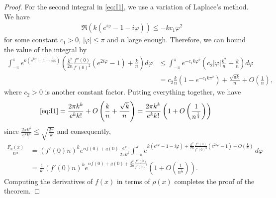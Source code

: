 \documentclass[reqno, 11pt]{amsart}
\theoremstyle{definition}
\theoremstyle{remark}
\numberwithin{equation}{section}
\begin{document}
\begin{proof}
    For the second integral in \eqref{eq:I1}, we use a variation of Laplace's method. We have
    \begin{align*}
        &\Re \left(k(e^{i\varphi} - 1 - i\varphi)\right) \le -k c_1\varphi^2
    \end{align*}
    for some constant $c_1> 0$, $|\varphi| \le \pi$ and $n$ large enough. 
    Therefore, we can bound the value of the integral by
    \begin{align*}
        \int_{-\pi}^\pi  e^{k(e^{i\varphi} - 1 - i\varphi)} \left(\frac{k^2}{2n} \frac{f''(0)}{f'(0)^2} (e^{2i\varphi} -1) + \frac{k}{n}\right)d\varphi &\leq  \int_{-\pi}^{\pi} e^{-c_1k \varphi^2} \left(c_2 |\varphi| \frac{k^2}{n} + \frac{k}{n}  
       \right) d\varphi       \\
        &= c_2\frac{k}{n}(1-e^{-c_1k\pi^2}) + \frac{\sqrt{\pi k}}{n}+ O\left(\frac{1}{n}\right),
    \end{align*}
    where $c_2>0$ is another constant factor.
    Putting everything together, we have 
    \begin{align*}
        \eqref{eq:I1} 
        &= \frac{2\pi k^k}{e^k k!} + O\left(\frac{k}{n}+\frac{\sqrt{k}}{n}\right)= \frac{2\pi k^k}{e^k k!}\left(1 + O\left(\frac{1}{n^{\frac{1}{4}}}\right)\right)
    \end{align*}
    since $\frac{2\pi k^k}{e^k k!} \leq \sqrt{\frac{2\pi}{k}}$ and consequently,
    \begin{align*}
        [x^k]\frac{F_n(x)}{n^\alpha} & = (f'(0)n)^k  e^{nf(0)+g(0)} \frac{e^k}{2\pi k^{k}}  
        \int_{-\pi}^\pi  e^{k(e^{i\varphi} - 1 - i\varphi) + \frac{k^2}{2n} \frac{f''(0)}{f'(0)^2} (e^{2i\varphi} -1) + O\left(\frac{k}{n}\right)} \, d\varphi\\
        &= \frac{1}{k!}(f'(0)n)^k  e^{nf(0)+g(0)+\frac{k^2}{2n} \frac{f''(0)}{f'(0)^2}}\left(1+O\left(\frac{1}{n^{\frac 14}}\right)\right).
    \end{align*}   
    Computing the derivatives of $f(x)$ in terms of $\rho(x)$ completes the proof of the theorem.
\end{proof}
\end{document}
